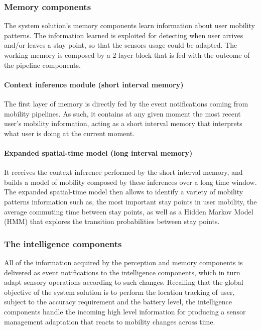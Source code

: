 \documentclass[ENG,PhD]{cinvestav}
\begin{document}
\subsubsection{Memory components}
The system solution's memory components learn information about user mobility patterns.
The information learned is exploited for detecting when user arrives and/or leaves a stay point, so that the sensors usage could be adapted.
The working memory is composed by a 2-layer block that is fed with the outcome of the pipeline components.

\paragraph*{Context inference module (short interval memory)}
The first layer of memory is directly fed by the event notifications coming from mobility pipelines.
As such, it contains at any given moment the most recent user's mobility information, acting as a short interval memory that interprets what user is doing at the current moment.

\paragraph*{Expanded spatial-time model (long interval memory)}
It receives the context inference performed by the short interval memory, and builds a model of mobility composed by these inferences over a long time window.
The expanded spatial-time model then allows to identify a variety of mobility patterns information such as, the most important stay points in user mobility, the average commuting time between stay points, as well as a Hidden Markov Model (HMM) that explores the transition probabilities between stay points.

\subsubsection{The intelligence components}
All of the information acquired by the perception and memory components is delivered as event notifications to the intelligence components, which in turn adapt sensory operations according to such changes.
Recalling that the global objective of the system solution is to perform the location tracking of user, subject to the accuracy requirement and the battery level, the intelligence components handle the incoming high level information for producing a sensor management adaptation that reacts to mobility changes across time.
\end{document}

